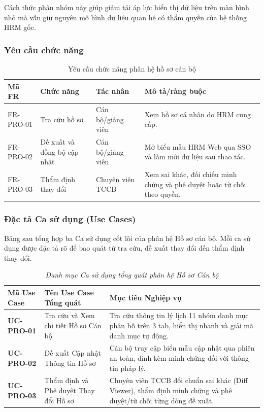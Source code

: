 Cách thức phân nhóm này giúp giảm tải áp lực hiển thị dữ liệu trên màn hình nhỏ mà vẫn giữ nguyên mô hình dữ liệu quan hệ có thẩm quyền của hệ thống HRM gốc.

\subsubsection{Yêu cầu chức năng}

\begin{table}[H]
\centering
\small
\caption{Yêu cầu chức năng phân hệ hồ sơ cán bộ}
\label{tab:fr_profile}
\begin{tabularx}{\textwidth}{|L{1.7cm}|L{3.1cm}|L{2.4cm}|Y|}
\hline
\textbf{Mã FR} & \textbf{Chức năng} & \textbf{Tác nhân} & \textbf{Mô tả/ràng buộc} \\
\hline
FR-PRO-01 & Tra cứu hồ sơ & Cán bộ/giảng viên & Xem hồ sơ cá nhân do HRM cung cấp. \\
\hline
FR-PRO-02 & Đề xuất và đồng bộ cập nhật & Cán bộ/giảng viên & Mở biểu mẫu HRM Web qua SSO và làm mới dữ liệu sau thao tác. \\
\hline
FR-PRO-03 & Thẩm định thay đổi & Chuyên viên TCCB & Xem sai khác, đối chiếu minh chứng và phê duyệt hoặc từ chối theo quyền. \\
\hline
\end{tabularx}
\end{table}

\subsubsection{Đặc tả Ca sử dụng (Use Cases)}

Bảng sau tổng hợp ba Ca sử dụng cốt lõi của phân hệ Hồ sơ cán bộ. Mỗi ca sử dụng được đặc tả rõ để bao quát từ tra cứu, đề xuất thay đổi đến thẩm định thay đổi.

\begin{table}[H]
\centering
\caption[\textit{Danh mục Use Case tổng quát phân hệ Hồ sơ Cán bộ}]{\textit{Danh mục Ca sử dụng tổng quát phân hệ Hồ sơ Cán bộ}}
\label{tab:mapping_uc_pro}
\vspace{0.15cm}
\begin{tabularx}{\textwidth}{|>{\RaggedRight\arraybackslash\small}p{2.8cm}|>{\RaggedRight\arraybackslash\small}p{4.2cm}|Y|}
\hline
\textbf{Mã Use Case} & \textbf{Tên Use Case Tổng quát} & \textbf{Mục tiêu Nghiệp vụ} \\
\hline
\textbf{UC-PRO-01} & Tra cứu và Xem chi tiết Hồ sơ Cán bộ & Tra cứu thông tin lý lịch 11 nhóm danh mục phân bố trên 3 tab, hiển thị nhanh và giải mã danh mục tự động. \\
\hline
\textbf{UC-PRO-02} & Đề xuất Cập nhật Thông tin Hồ sơ & Cán bộ truy cập biểu mẫu cập nhật qua phiên an toàn, đính kèm minh chứng đối với thông tin pháp lý. \\
\hline
\textbf{UC-PRO-03} & Thẩm định và Phê duyệt Thay đổi Hồ sơ & Chuyên viên TCCB đối chuẩn sai khác (Diff Viewer), thẩm định minh chứng và phê duyệt/từ chối từng dòng đề xuất. \\
\hline
\end{tabularx}
\end{table}

